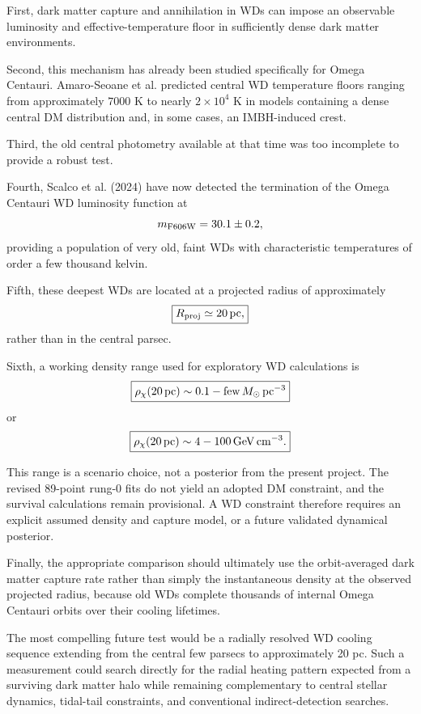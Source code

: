 \documentclass[11pt,a4paper]{article}
\begin{document}
First, dark matter capture and annihilation in WDs can impose an observable luminosity and effective-temperature floor in sufficiently dense dark matter environments.

Second, this mechanism has already been studied specifically for Omega Centauri. Amaro-Seoane et al. predicted central WD temperature floors ranging from approximately $7000$ K to nearly $2\times10^4$ K in models containing a dense central DM distribution and, in some cases, an IMBH-induced crest.

Third, the old central photometry available at that time was too incomplete to provide a robust test.

Fourth, Scalco et al. (2024) have now detected the termination of the Omega Centauri WD luminosity function at
\begin{equation}
m_{\rm F606W}=30.1\pm0.2,
\end{equation}
providing a population of very old, faint WDs with characteristic temperatures of order a few thousand kelvin.

Fifth, these deepest WDs are located at a projected radius of approximately
\begin{equation}
\boxed{
R_{\rm proj}\simeq20\,{\rm pc},
}
\end{equation}
rather than in the central parsec.

Sixth, a working density range used for exploratory WD calculations is
\begin{equation}
\boxed{
\rho_\chi(20\,{\rm pc})
\sim0.1-\mathrm{few}\,
M_\odot\,{\rm pc}^{-3}
}
\end{equation}
or
\begin{equation}
\boxed{
\rho_\chi(20\,{\rm pc})
\sim4-100\,
{\rm GeV\,cm^{-3}}.
}
\end{equation}

This range is a scenario choice, not a posterior from the present project. The revised
89-point rung-0 fits do not yield an adopted DM constraint, and the survival calculations
remain provisional. A WD constraint therefore requires an explicit assumed density and
capture model, or a future validated dynamical posterior.

Finally, the appropriate comparison should ultimately use the orbit-averaged dark matter capture rate rather than simply the instantaneous density at the observed projected radius, because old WDs complete thousands of internal Omega Centauri orbits over their cooling lifetimes.

The most compelling future test would be a radially resolved WD cooling sequence extending from the central few parsecs to approximately 20 pc. Such a measurement could search directly for the radial heating pattern expected from a surviving dark matter halo while remaining complementary to central stellar dynamics, tidal-tail constraints, and conventional indirect-detection searches.
\end{document}
